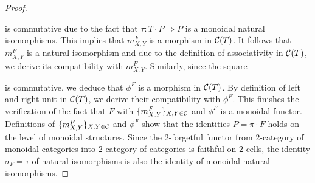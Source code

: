 \begin{proof}
\begin{center}
\end{center}
is commutative due to the fact that $\tau:T\cdot P \Rightarrow P$ is a monoidal natural isomorphisms. This implies that $m^F_{X,Y}$ is a morphism in ${\mathcal C}(T)$. It follows that $m^F_{X,Y}$ is a natural isomorphism and due to the definition of associativity in ${\mathcal C}(T)$, we derive its compatibility with $m^F_{X,Y}$. Similarly, since the square
\begin{center}
\end{center}
is commutative, we deduce that $\phi^F$ is a morphism in ${\mathcal C}(T)$. By definition of left and right unit in ${\mathcal C}(T)$, we derive their compatibility with $\phi^F$. This finishes the verification of the fact that $F$ with $\{m^F_{X,Y}\}_{X,Y\in {\mathcal C}}$ and $\phi^F$ is a monoidal functor. Definitions of $\{m^F_{X,Y}\}_{X,Y\in {\mathcal C}}$ and $\phi^F$ show that the identities $P = \pi\cdot F$ holds on the level of monoidal structures. Since the $2$-forgetful functor from $2$-category of monoidal categories into $2$-category of categories is faithful on $2$-cells, the identity $\sigma_F = \tau$ of natural isomorphisms is also the identity of monoidal natural isomorphisms.
\end{proof}

